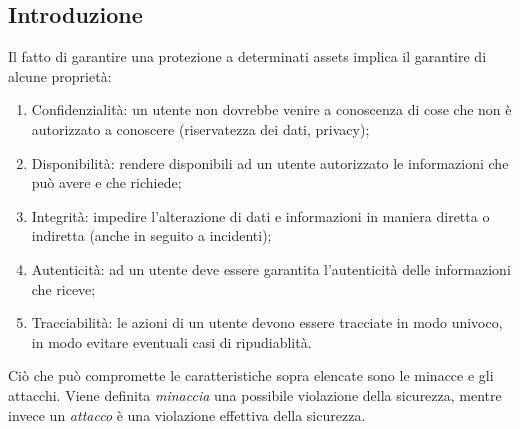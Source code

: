 \documentclass[a4paper, 11pt]{article}
\begin{document}
	\begin{frontespizio}
	\end{frontespizio}
	
	\tableofcontents
	
	\newpage
	

	\begin{multicols}{2}
		\begin{abstract}
			Questa dispensa è scritta per la parte teorica del corso di Programmazione e sicurezza di Rete. Non sono inclusi gli argomenti: SDN e la parte riguardante le tecnologie di comunicazione in rete (fibra, cavi ETH ecc.) Il codice \LaTeX è disponibile a \url{https://github.com/alx79/dispense-info-univr.git}
		\end{abstract}
		\section{Introduzione}
		Il fatto di garantire una protezione a determinati assets implica il garantire di alcune proprietà:
		\begin{enumerate}
			\item Confidenzialità: un utente non dovrebbe venire a conoscenza di cose che non è autorizzato a conoscere (riservatezza dei dati, privacy);
			
			\item Disponibilità: rendere disponibili ad un utente autorizzato le informazioni che può avere e che richiede;
			
			\item Integrità: impedire l'alterazione di dati e informazioni in maniera diretta o indiretta (anche in seguito a incidenti);
			
			\item Autenticità: ad un utente deve essere garantita l'autenticità delle informazioni che riceve;
			
			\item Tracciabilità: le azioni di un utente devono essere tracciate in modo univoco, in modo evitare eventuali casi di ripudiablità.
		\end{enumerate}
		
		Ciò che può compromette le caratteristiche sopra elencate sono le minacce e gli attacchi. Viene definita \textit{minaccia} una possibile violazione della sicurezza, mentre invece un \textit{attacco} è una violazione effettiva della sicurezza.
		

\end{multicols}
\end{document}
